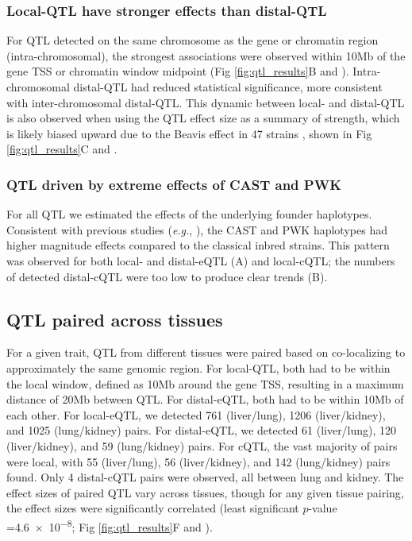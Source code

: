 \documentclass[10pt,letterpaper]{article}
\newcommand{\eg}{\emph{e.g.}\xspace}
\begin{document}
\subsubsection*{Local-QTL have stronger effects than distal-QTL}
For QTL detected on the same chromosome as the gene or chromatin region (intra-chromosomal), the strongest associations were observed within 10Mb of the gene TSS or chromatin window midpoint (Fig \ref{fig:qtl_results}B and ). Intra-chromosomal distal-QTL had reduced statistical significance, more consistent with inter-chromosomal distal-QTL. This dynamic between local- and distal-QTL is also observed when using the QTL effect size as a summary of strength, which is likely biased upward due to the Beavis effect in 47 strains \cite{Keele2019}, shown in Fig \ref{fig:qtl_results}C and .

\subsubsection*{QTL driven by extreme effects of CAST and PWK}
For all QTL we estimated the effects of the underlying founder haplotypes. Consistent with previous studies (\eg, \cite{Aylor2011}), the CAST and PWK haplotypes had higher magnitude effects compared to the classical inbred strains. This pattern was observed for both local- and distal-eQTL (A) and local-cQTL; the numbers of detected distal-cQTL were too low to produce clear trends (B).

\subsection*{QTL paired across tissues}

For a given trait, QTL from different tissues were paired based on co-localizing to approximately the same genomic region. For local-QTL, both had to be within the local window, defined as 10Mb around the gene TSS, resulting in a maximum distance of 20Mb between QTL. For distal-eQTL, both had to be within 10Mb of each other. 
For local-eQTL, we detected 761 (liver/lung), 1206 (liver/kidney), and 1025 (lung/kidney) pairs. For distal-eQTL, we detected 61 (liver/lung), 120 (liver/kidney), and 59 (lung/kidney) pairs. For cQTL, the vast majority of pairs were local, with 55 (liver/lung), 56 (liver/kidney), and 142 (lung/kidney) pairs found. Only 4 distal-cQTL pairs were observed, all between lung and kidney. The effect sizes of paired QTL vary across tissues, though for any given tissue pairing, the effect sizes were significantly correlated (least significant $p$-value =\num{4.6e-8}; Fig \ref{fig:qtl_results}F and ).
\end{document}
